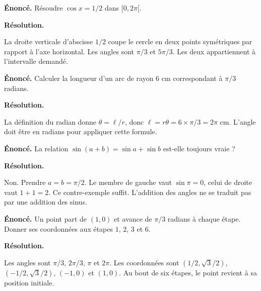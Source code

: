 \documentclass[11pt,a4paper]{article}
\begin{document}
\par\noindent\begin{minipage}{\linewidth}
{\small\color{Muted}\textbf{Énoncé.} Résoudre $\cos x=1/2$ dans $[0,2\pi[$.}
\par\medskip
\textbf{Résolution.}\par
La droite verticale d’abscisse $1/2$ coupe le cercle en deux points symétriques par rapport à l’axe horizontal. Les angles sont $\pi/3$ et $5\pi/3$. Les deux appartiennent à l’intervalle demandé.
\end{minipage}\par
\par\noindent\begin{minipage}{\linewidth}
{\small\color{Muted}\textbf{Énoncé.} Calculer la longueur d’un arc de rayon $6$ cm correspondant à $\pi/3$ radians.}
\par\medskip
\textbf{Résolution.}\par
La définition du radian donne $\theta=\ell/r$, donc $\ell=r\theta=6\times\pi/3=2\pi$ cm. L’angle doit être en radians pour appliquer cette formule.
\end{minipage}\par
\par\noindent\begin{minipage}{\linewidth}
{\small\color{Muted}\textbf{Énoncé.} La relation $\sin(a+b)=\sin a+\sin b$ est-elle toujours vraie ?}
\par\medskip
\textbf{Résolution.}\par
Non. Prendre $a=b=\pi/2$. Le membre de gauche vaut $\sin\pi=0$, celui de droite vaut $1+1=2$. Ce contre-exemple suffit. L’addition des angles ne se traduit pas par une addition des sinus.
\end{minipage}\par
\par\noindent\begin{minipage}{\linewidth}
{\small\color{Muted}\textbf{Énoncé.} Un point part de $(1,0)$ et avance de $\pi/3$ radians à chaque étape. Donner ses coordonnées aux étapes $1$, $2$, $3$ et $6$.}
\par\medskip
\textbf{Résolution.}\par
Les angles sont $\pi/3$, $2\pi/3$, $\pi$ et $2\pi$. Les coordonnées sont $(1/2,\sqrt3/2)$, $(-1/2,\sqrt3/2)$, $(-1,0)$ et $(1,0)$. Au bout de six étapes, le point revient à sa position initiale.
\end{minipage}\par
\end{document}
